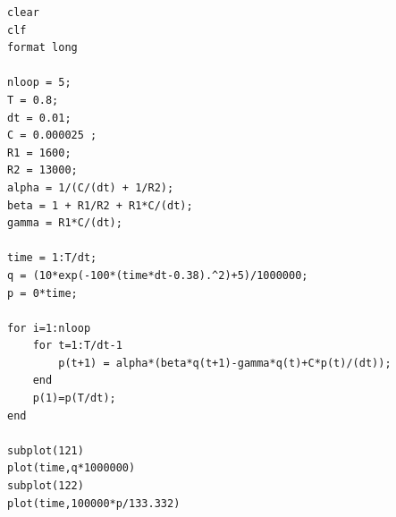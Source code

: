 \documentclass[a4paper]{article}
\newcounter{c}
\newcounter{d}
\newcounter{r}
\newcounter{e}
\begin{document}
\bigskip

\bigskip

\begin{verbatim}
clear
clf
format long

nloop = 5;
T = 0.8;
dt = 0.01;
C = 0.000025 ;
R1 = 1600;
R2 = 13000;
alpha = 1/(C/(dt) + 1/R2);
beta = 1 + R1/R2 + R1*C/(dt);
gamma = R1*C/(dt);

time = 1:T/dt;
q = (10*exp(-100*(time*dt-0.38).^2)+5)/1000000;
p = 0*time;

for i=1:nloop    
    for t=1:T/dt-1
        p(t+1) = alpha*(beta*q(t+1)-gamma*q(t)+C*p(t)/(dt));
    end
    p(1)=p(T/dt);
end

subplot(121)
plot(time,q*1000000)
subplot(122)
plot(time,100000*p/133.332)
\end{verbatim}
\end{document}
